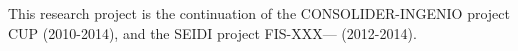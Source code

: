 
%

This research project is the continuation of the CONSOLIDER-INGENIO project CUP (2010-2014), and the SEIDI project FIS-XXX--- (2012-2014). 

%
%
